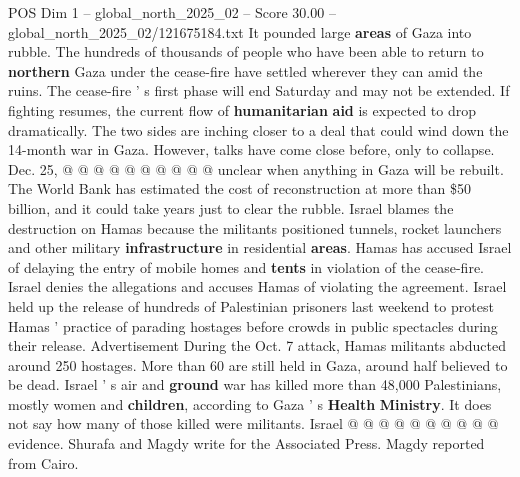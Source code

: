 \begin{textsample}{POS Dim 1 – global\_north\_2025\_02 – Score 30.00 – global\_north\_2025\_02/121675184.txt}
It pounded large \textbf{areas} of Gaza into rubble.
The hundreds of thousands of people who have been able to return to \textbf{northern} Gaza under the cease-fire have settled wherever they can amid the ruins.
The cease-fire ' s first phase will end Saturday and may not be extended.
If fighting resumes, the current flow of \textbf{humanitarian} \textbf{aid} is expected to drop dramatically.
The two sides are inching closer to a deal that could wind down the 14-month war in Gaza.
However, talks have come close before, only to collapse.
Dec. 25, @ @ @ @ @ @ @ @ @ @ unclear when anything in Gaza will be rebuilt.
The World Bank has estimated the cost of reconstruction at more than \$50 billion, and it could take years just to clear the rubble.
Israel blames the destruction on Hamas because the militants positioned tunnels, rocket launchers and other military \textbf{infrastructure} in residential \textbf{areas}.
Hamas has accused Israel of delaying the entry of mobile homes and \textbf{tents} in violation of the cease-fire.
Israel denies the allegations and accuses Hamas of violating the agreement.
Israel held up the release of hundreds of Palestinian prisoners last weekend to protest Hamas ' practice of parading hostages before crowds in public spectacles during their release.
Advertisement During the Oct. 7 attack, Hamas militants abducted around 250 hostages.
More than 60 are still held in Gaza, around half believed to be dead.
Israel ' s air and \textbf{ground} war has killed more than 48,000 Palestinians, mostly women and \textbf{children}, according to Gaza ' s \textbf{Health} \textbf{Ministry}.
It does not say how many of those killed were militants.
Israel @ @ @ @ @ @ @ @ @ @ evidence.
Shurafa and Magdy write for the Associated Press.
Magdy reported from Cairo.

\end{textsample}
